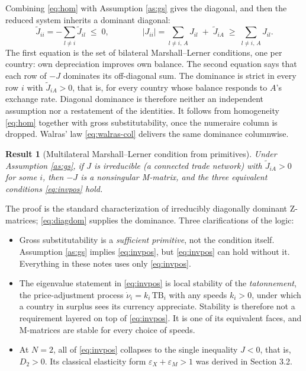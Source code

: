 \documentclass[11pt]{article}
\newtheorem{result}{Result}[section]
\begin{document}
Combining \eqref{eq:hom} with Assumption \ref{as:gs} gives the diagonal, and then the reduced system inherits a dominant diagonal:
\begin{equation}
\widetilde J_{ii} = -\sum_{l \neq i} \widetilde J_{il} \;\leq\; 0,
\qquad\qquad
|J_{ii}| = \sum_{l \neq i,\,A} J_{il} \;+\; \widetilde J_{iA}
\;\geq\; \sum_{l \neq i,\,A} J_{il} .
\label{eq:diagdom}
\end{equation}
The first equation is the set of bilateral Marshall--Lerner conditions, one per country: own depreciation improves own balance. The second equation says that each row of $-J$ dominates its off-diagonal sum. The dominance is strict in every row $i$ with $\widetilde J_{iA} > 0$, that is, for every country whose balance responds to $A$'s exchange rate. Diagonal dominance is therefore neither an independent assumption nor a restatement of the identities. It follows from homogeneity \eqref{eq:hom} together with gross substitutability, once the numeraire column is dropped. Walras' law \eqref{eq:walras-col} delivers the same dominance columnwise.

\begin{result}[Multilateral Marshall--Lerner condition from primitives]
Under Assumption \ref{as:gs}, if $J$ is irreducible (a connected trade network) with $\widetilde J_{iA} > 0$ for some $i$, then $-J$ is a nonsingular M-matrix, and the three equivalent conditions \eqref{eq:invpos} hold.
\label{res:mml}
\end{result}
\noindent The proof is the standard characterization of irreducibly diagonally dominant Z-matrices; \eqref{eq:diagdom} supplies the dominance. Three clarifications of the logic:
\begin{itemize}
\item Gross substitutability is a \emph{sufficient primitive}, not the condition itself. Assumption \ref{as:gs} implies \eqref{eq:invpos}, but \eqref{eq:invpos} can hold without it. Everything in these notes uses only \eqref{eq:invpos}.
\item The eigenvalue statement in \eqref{eq:invpos} is local stability of the \emph{tatonnement}, the price-adjustment process $\dot\nu_i = k_i\, \mathrm{TB}_i$ with any speeds $k_i > 0$, under which a country in surplus sees its currency appreciate. Stability is therefore not a requirement layered on top of \eqref{eq:invpos}. It is one of its equivalent faces, and M-matrices are stable for every choice of speeds.
\item At $N = 2$, all of \eqref{eq:invpos} collapses to the single inequality $J < 0$, that is, $D_2 > 0$. Its classical elasticity form $\varepsilon_X + \varepsilon_M > 1$ was derived in Section 3.2.
\end{itemize}
\end{document}

